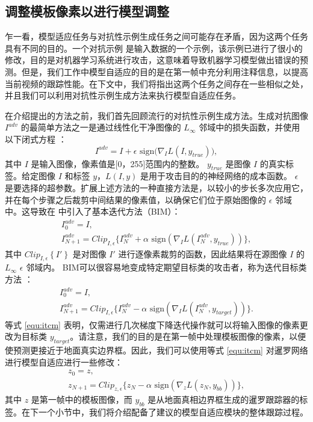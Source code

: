 \subsection{调整模板像素以进行模型调整}
乍一看，模型适应任务与对抗性示例生成任务之间可能存在矛盾，因为这两个任务具有不同的目的。一个对抗示例 \cite{kurakin2017adversarial} 是输入数据的一个示例，该示例已进行了很小的修改，目的是对机器学习系统进行攻击，这意味着导致机器学习模型做出错误的预测。但是，我们工作中模型自适应的目的是在第一帧中充分利用注释信息，以提高当前视频的跟踪性能。在下文中，我们将指出这两个任务之间存在一些相似之处，并且我们可以利用对抗性示例生成方法来执行模型自适应任务。

在介绍提出的方法之前，我们首先回顾流行的对抗性示例生成方法。生成对抗图像 $I^{adv}$ 的最简单方法之一是通过线性化干净图像的 $L_{\infty}$ 邻域中的损失函数，并使用以下闭式方程 \cite{FGSM}：
\begin{equation}
    I^{adv} = I + \epsilon \text{ sign} \bigl( \nabla_I L(I, y_{true})  \bigr),
\end{equation}
其中 $I$ 是输入图像，像素值是[0，255]范围内的整数。 $y_{true}$ 是图像 $I$ 的真实标签。给定图像 $I$ 和标签 $y$，$L(I, y)$ 是用于攻击目的的神经网络的成本函数。 $\epsilon$ 是要选择的超参数。扩展上述方法的一种直接方法是，以较小的步长多次应用它，并在每个步骤之后裁剪中间结果的像素值，以确保它们位于原始图像的 $\epsilon$ 邻域中。这导致在 \cite{kurakin2017adversarial} 中引入了基本迭代方法（BIM）：
\begin{equation}
    \begin{gathered}
        I_0^{adv} = I, \\
        I_{N+1}^{adv} = Clip_{I,\epsilon}\{I_N^{adv}+\alpha \text{ sign}(\nabla_I L(I_N^{adv},y_{true}))\},
    \end{gathered}
\end{equation}
其中 $Clip_{I, \epsilon} \left\{ I' \right\}$ 是对图像 $I'$ 进行逐像素裁剪的函数，因此结果将在源图像 $I$ 的$L_{\infty}$ $\epsilon$ 邻域内。
BIM可以很容易地变成特定期望目标类的攻击者，称为迭代目标类方法 \cite{kurakin2017adversarial}：
\begin{equation}
    \begin{gathered}
        I_0^{adv} = I,\\
        I_{N+1}^{adv} = Clip_{I,\epsilon}\{I_N^{adv}-\alpha \text{ sign}(\nabla_I L(I_N^{adv},y_{target}))\}.
    \end{gathered}
    \label{equ:itcm}
\end{equation}
等式 \ref{equ:itcm} 表明，仅需进行几次梯度下降迭代操作就可以将输入图像的像素更改为目标类 $y_{target}$。请注意，我们的目的是在第一帧中处理模板图像的像素，以便使预测更接近于地面真实边界框。因此，我们可以使用等式 \ref{equ:itcm} 对暹罗网络进行模型自适应进行一些修改：
\begin{equation}
    \begin{gathered}
        z_0 = z,\\
        z_{N+1} = Clip_{z,\epsilon}\{z_N -\alpha \text{ sign}(\nabla_z L(z_N,y_{bb}))\},
    \end{gathered}
    \label{equ:adaptaion}
\end{equation}
其中 $z$ 是第一帧中的模板图像，而 $y_{bb}$ 是从地面真相边界框生成的暹罗跟踪器的标签。在下一个小节中，我们将介绍配备了建议的模型自适应模块的整体跟踪过程。

